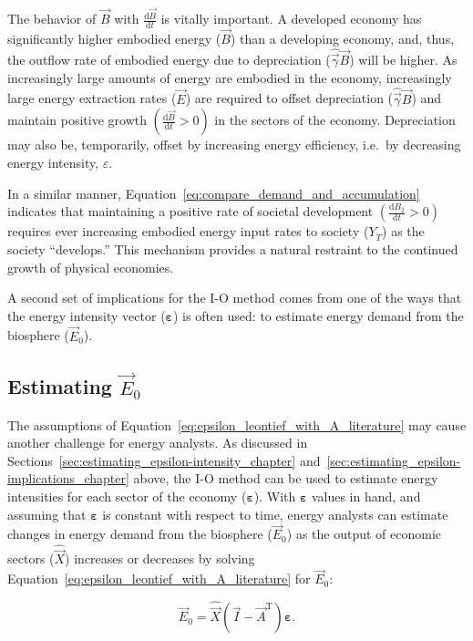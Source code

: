 The behavior of $\vec{B}$ with $\frac{\mathrm{d}\vec{B}}{\mathrm{d}t}$ 
is vitally important. 
A developed economy has significantly higher embodied energy ($\vec{B}$) 
than a developing economy, and, thus, 
the outflow rate of embodied energy 
due to depreciation ($\hat{\vec{\gamma}}\vec{B}$) will be higher. 
As increasingly large amounts of energy are embodied in the economy, 
increasingly large energy extraction rates ($\vec{E}$) 
are required to offset depreciation ($\hat{\vec{\gamma}}\vec{B}$) 
and maintain positive growth $\left(\frac{\mathrm{d}\vec{B}}{\mathrm{d}t} > 0\right)$ 
in the sectors of the economy. 
Depreciation may also be, temporarily, 
offset by increasing energy efficiency, i.e.\ by decreasing energy intensity, $\varepsilon$.

In a similar manner, 
Equation~\ref{eq:compare_demand_and_accumulation} 
indicates that maintaining a positive rate of societal development 
$\left(\frac{\mathrm{d}B_{2}}{\mathrm{d}t} > 0\right)$ 
requires ever increasing embodied energy input rates 
to society ($Y_{\dot{T}}$) as the society ``develops.'' 
This mechanism provides a natural restraint
to the continued growth of physical economies.

A second set of implications for the I-O method 
comes from one of the ways that 
the energy intensity vector ($\bm{\varepsilon}$)
is often used: to estimate energy demand from the biosphere ($\vec{E}_{0}$).


\subsection{Estimating $\vec{E}_{0}$}

The assumptions of Equation~\ref{eq:epsilon_leontief_with_A_literature}
may cause another challenge for energy analysts. 
As discussed in Sections~\ref{sec:estimating_epsilon-intensity_chapter} 
and~\ref{sec:estimating_epsilon-implications_chapter} above, 
the I-O method can be used to estimate energy intensities 
for each sector of the economy ($\bm{\varepsilon}$). 
With $\bm{\varepsilon}$ values in hand,
and assuming that $\bm{\varepsilon}$ is constant with respect to time,
energy analysts can estimate changes in energy demand 
from the biosphere ($\vec{E}_{0}$) 
as the output of economic sectors ($\hat{\vec{X}}$) 
increases or decreases by solving 
Equation~\ref{eq:epsilon_leontief_with_A_literature} 
for $\vec{E}_{0}$:

\begin{equation} \label{eq:Leontief_lit_solved_for_E}
	\vec{E}_{0} 
	= \hat{\vec{X}}(\vec{I} - \vec{A}^{\mathrm{T}})\bm{\varepsilon}.
\end{equation}

